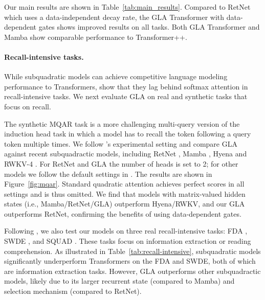Our main results are shown in Table~\ref{tab:main_results}. Compared to RetNet which uses a data-independent decay rate, the GLA Transformer with data-dependent gates shows improved results on all tasks. Both GLA Transformer and Mamba show comparable performance to Transformer++. 
\vspace{-2mm}

\paragraph{Recall-intensive tasks.} While subquadratic models can achieve competitive language modeling performance to Transformers, \citet{Arora2024SimpleLA} show that they  lag behind softmax attention in recall-intensive tasks. We next  evaluate GLA on real and synthetic tasks that focus on recall. 

The synthetic MQAR task \cite{zoology} is a more challenging multi-query version of the induction head task \cite{h3} in which a model has to recall the token following a query token multiple times.   We follow 
\citet{zoology}'s experimental setting and compare GLA against recent subquadractic models, including RetNet \cite{sun2023retentive}, Mamba \cite{Gu2023MambaLS}, Hyena \cite{hyena} and  RWKV-4 \cite{rwkv}. For RetNet and GLA the number of heads is set to 2; for other models we follow the default settings in \citet{zoology}. The results are shown in Figure~\ref{fig:mqar}. Standard quadratic attention achieves perfect scores in all settings and is thus omitted. We find that models with matrix-valued hidden states (i.e., Mamba/RetNet/GLA) outperform Hyena/RWKV, and our GLA outperforms RetNet, confirming the benefits of using data-dependent gates.

Following \citet{Arora2024SimpleLA}, we also test our models on three real recall-intensive tasks: FDA \cite{arora_language_2023}, SWDE \cite{lockard_openceres_2019}, and SQUAD \cite{rajpurkar_know_2018}. These tasks focus on information extraction or reading comprehension. As illustrated in Table~\ref{tab:recall-intensive}, subquadratic models significantly underperform Transformers on the FDA and SWDE, both of which are information extraction tasks. However, GLA outperforms other subquadractic models, likely due to its larger recurrent state (compared to Mamba) and selection mechanism (compared to RetNet).

